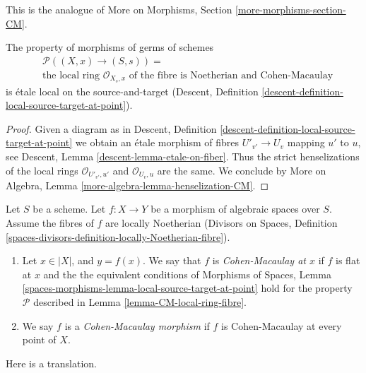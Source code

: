 \noindent
This is the analogue of More on Morphisms, Section
\ref{more-morphisms-section-CM}.

\begin{lemma}
\label{lemma-CM-local-ring-fibre}
The property of morphisms of germs of schemes
\begin{align*}
& \mathcal{P}((X, x) \to (S, s)) = \\
& \text{the local ring }
\mathcal{O}_{X_s, x}
\text{ of the fibre is Noetherian and Cohen-Macaulay}
\end{align*}
is \'etale local on the source-and-target (Descent, Definition
\ref{descent-definition-local-source-target-at-point}).
\end{lemma}

\begin{proof}
Given a diagram as in
Descent, Definition \ref{descent-definition-local-source-target-at-point}
we obtain an \'etale morphism of fibres
$U'_{v'} \to U_v$ mapping $u'$ to $u$, see
Descent, Lemma \ref{descent-lemma-etale-on-fiber}.
Thus the strict henselizations of the local rings
$\mathcal{O}_{U'_{v'}, u'}$ and $\mathcal{O}_{U_v, u}$
are the same. We conclude by
More on Algebra, Lemma \ref{more-algebra-lemma-henselization-CM}.
\end{proof}

\begin{definition}
\label{definition-CM}
Let $S$ be a scheme.
Let $f : X \to Y$ be a morphism of algebraic spaces over $S$.
Assume the fibres of $f$ are locally Noetherian
(Divisors on Spaces, Definition
\ref{spaces-divisors-definition-locally-Noetherian-fibre}).
\begin{enumerate}
\item Let $x \in |X|$, and $y = f(x)$. We say that $f$ is
{\it Cohen-Macaulay at $x$} if $f$ is flat at $x$ and the
the equivalent conditions of
Morphisms of Spaces, Lemma
\ref{spaces-morphisms-lemma-local-source-target-at-point}
hold for the property $\mathcal{P}$ described in
Lemma \ref{lemma-CM-local-ring-fibre}.
\item We say $f$ is a {\it Cohen-Macaulay morphism} if $f$ is
Cohen-Macaulay at every point of $X$.
\end{enumerate}
\end{definition}

\noindent
Here is a translation.

